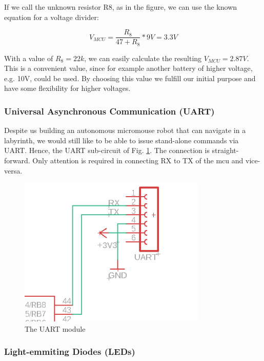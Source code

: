 If we call the unknown resistor R8, as in the figure, we can use the known equation for a voltage divider:

$$V_{MCU} = \frac{R_8}{47+R_8} * 9V = 3.3V$$

With a value of $ R_8 = 22k $, we can easily calculate the resulting $V_{MCU} = 2.87V$. This is a convenient value, since for example another battery of higher voltage, e.g. 10V, could be used. By choosing this value we fulfill our initial purpose and have some flexibility for higher voltages.

\vspace{1cm}

\subsubsection{Universal Asynchronous Communication (UART)}


Despite us building an autonomous micromouse robot that can navigate in a labyrinth, we would still like to be able to issue stand-alone commands via UART. Hence, the UART sub-circuit of Fig. \ref{fig:uart}. The connection is straight-forward. Only attention is required in connecting RX to TX of the mcu and vice-versa.

\begin{figure}[htb]
    \centering
    \includegraphics[width=0.8\textwidth]{figures/hardware/UART.PNG}
    \caption{The UART module}
    \label{fig:uart}
\end{figure}

\FloatBarrier
\vspace{1cm}


\subsubsection{Light-emmiting Diodes (LEDs)}


